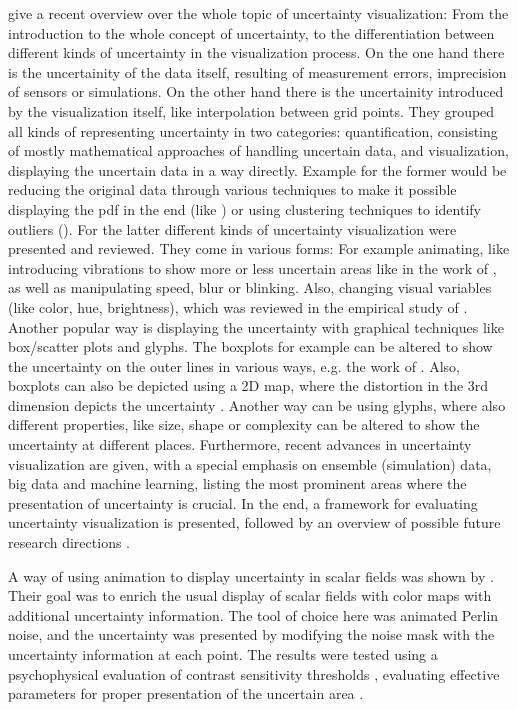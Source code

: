 \citeauthor{kamal_recent_2021} give a recent overview over the whole topic of uncertainty visualization: From the introduction to  the whole concept of uncertainty, to the differentiation between different kinds of uncertainty in the visualization process.
On the one hand there is the uncertainity of the data itself, resulting of measurement errors, imprecision of sensors or simulations. 
On the other hand there is the uncertainity introduced by the visualization itself, like interpolation between grid points.  
They grouped all kinds of representing uncertainty in two categories: quantification, consisting of mostly mathematical approaches of handling uncertain data, and visualization, displaying the uncertain data in a way directly. 
Example for the former would be reducing the original data through various techniques to make it possible displaying the \ac{pdf} in the end (like ) or using clustering techniques to identify outliers (\cite{bordoloi_visualization_2004}). 
For the latter different kinds of uncertainty visualization were presented and reviewed.
They come in various forms: For example animating, like introducing vibrations to show more or less uncertain areas  like in the work of ,  as well as manipulating speed, blur or blinking.  
Also, changing visual variables (like color, hue, brightness), which was reviewed in the empirical study of . 
Another popular way is displaying the uncertainty with graphical techniques like box/scatter plots and glyphs.
The boxplots for example can be altered to show the uncertainty on the outer lines in various ways, e.g. the work of \cite{benjamini_opening_1988}. 
Also, boxplots can also be depicted using a 2D map, where the distortion in the 3rd dimension depicts the uncertainty \cite{kao_visualizing_2002}. 
Another way can be using glyphs, where also different properties, like size, shape or complexity can be altered to show the uncertainty at different places. 
Furthermore, recent advances in uncertainty visualization are given, with a special emphasis on ensemble (simulation) data, big data and machine learning, listing the most prominent areas where the presentation of uncertainty is crucial. 
In the end, a framework for evaluating uncertainty visualization is presented, followed by an overview of possible future research directions \cite{kamal_recent_2021}. 

A way of using animation to display uncertainty in scalar fields was shown by \citeauthor{coninx_visualization_2011}. 
Their goal was to enrich the usual display of scalar fields with color maps with additional uncertainty information. 
The tool of choice here was animated Perlin noise, and the uncertainty was presented by modifying the noise mask with the uncertainty information at each point. 
The results were tested using a psychophysical evaluation of contrast sensitivity thresholds \cite{coninx_visualization_2011}, evaluating effective parameters for proper presentation of the uncertain area \cite{coninx_visualization_2011}.

